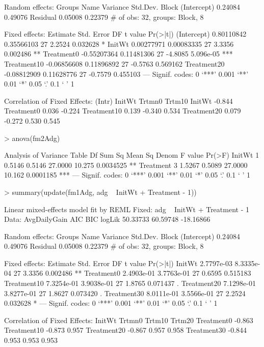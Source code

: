 \documentclass[12pt]{article}
\begin{document}
\begin{Schunk}
\begin{Soutput}
Random effects:
 Groups   Name        Variance Std.Dev.
 Block    (Intercept) 0.24084  0.49076 
 Residual             0.05008  0.22379 
# of obs: 32, groups: Block, 8

Fixed effects:
               Estimate  Std. Error DF t value  Pr(>|t|)    
(Intercept)  0.80110842  0.35566103 27  2.2524  0.032628 *  
InitWt       0.00277971  0.00083335 27  3.3356  0.002486 ** 
Treatment0  -0.55207364  0.11481306 27 -4.8085 5.096e-05 ***
Treatment10 -0.06856608  0.11896892 27 -0.5763  0.569162    
Treatment20 -0.08812909  0.11628776 27 -0.7579  0.455103    
---
Signif. codes:  0 `***' 0.001 `**' 0.01 `*' 0.05 `.' 0.1 ` ' 1 

Correlation of Fixed Effects:
            (Intr) InitWt Trtmn0 Trtm10
InitWt      -0.844                     
Treatment0   0.036 -0.224              
Treatment10  0.139 -0.340  0.534       
Treatment20  0.079 -0.272  0.530  0.545
\end{Soutput}
\begin{Sinput}
> anova(fm2Adg)
\end{Sinput}
\begin{Soutput}
Analysis of Variance Table
          Df  Sum Sq Mean Sq   Denom F value    Pr(>F)    
InitWt     1  0.5146  0.5146 27.0000  10.275 0.0034525 ** 
Treatment  3  1.5267  0.5089 27.0000  10.162 0.0001185 ***
---
Signif. codes:  0 `***' 0.001 `**' 0.01 `*' 0.05 `.' 0.1 ` ' 1 
\end{Soutput}
\begin{Sinput}
> summary(update(fm1Adg, adg ~ InitWt + Treatment - 1))
\end{Sinput}
\begin{Soutput}
Linear mixed-effects model fit by REML
Fixed: adg ~ InitWt + Treatment - 1 
 Data: AvgDailyGain 
      AIC      BIC    logLik
 50.33733 60.59748 -18.16866

Random effects:
 Groups   Name        Variance Std.Dev.
 Block    (Intercept) 0.24084  0.49076 
 Residual             0.05008  0.22379 
# of obs: 32, groups: Block, 8

Fixed effects:
              Estimate Std. Error DF t value Pr(>|t|)   
InitWt      2.7797e-03 8.3335e-04 27  3.3356 0.002486 **
Treatment0  2.4903e-01 3.7763e-01 27  0.6595 0.515183   
Treatment10 7.3254e-01 3.9038e-01 27  1.8765 0.071437 . 
Treatment20 7.1298e-01 3.8277e-01 27  1.8627 0.073420 . 
Treatment30 8.0111e-01 3.5566e-01 27  2.2524 0.032628 * 
---
Signif. codes:  0 `***' 0.001 `**' 0.01 `*' 0.05 `.' 0.1 ` ' 1 

Correlation of Fixed Effects:
            InitWt Trtmn0 Trtm10 Trtm20
Treatment0  -0.863                     
Treatment10 -0.873  0.957              
Treatment20 -0.867  0.957  0.958       
Treatment30 -0.844  0.953  0.953  0.953
\end{Soutput}
\end{Schunk}
\end{document}
